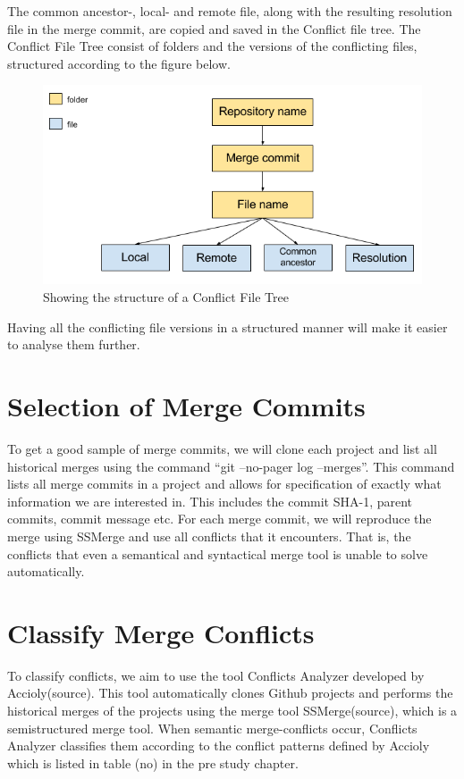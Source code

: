 The common ancestor-, local- and remote file, along with the resulting resolution file in the merge commit, are copied and saved in the Conflict file tree. The Conflict File Tree consist of folders and the versions of the conflicting files, structured according to the figure below.\\
\begin{figure}[H]
\centering
\includegraphics[width=400pt]{figure/conflicts.png}
\caption{Showing the structure of a Conflict File Tree}
\end{figure}

Having all the conflicting file versions in a structured manner will make it easier to analyse them further.

\section{Selection of Merge Commits}
To get a good sample of merge commits, we will clone each project and list all historical merges using the command “git --no-pager log --merges”. This command lists all merge commits in a project and allows for specification of exactly what information we are interested in. This includes the commit SHA-1, parent commits, commit message etc. For each merge commit, we will reproduce the merge using SSMerge and use all conflicts that it encounters. That is, the conflicts that even a semantical and syntactical merge tool is unable to solve automatically.
\section{Classify Merge Conflicts}
To classify conflicts, we aim to use the tool Conflicts Analyzer developed by Accioly(source). This tool automatically clones Github projects and performs the historical merges of the projects using the merge tool SSMerge(source), which is a semistructured merge tool. When semantic merge-conflicts occur, Conflicts Analyzer classifies them according to the conflict patterns defined by Accioly which is listed in table (no) in the pre study chapter.
